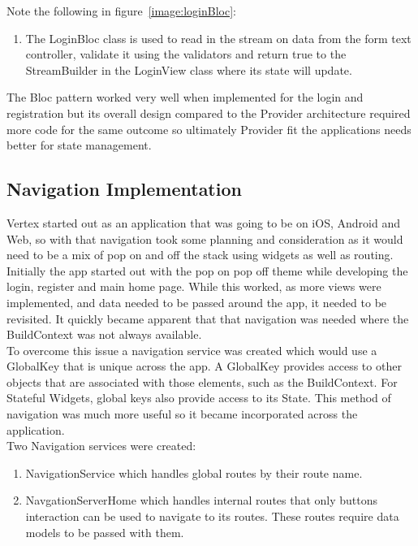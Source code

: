 Note the following in figure~\ref{image:loginBloc}:
\begin{enumerate}
    \item The LoginBloc class is used to read in the stream on data from the form text controller, validate it using the validators and return true to the StreamBuilder in the LoginView class where its state will update.
\end{enumerate}
The Bloc pattern worked very well when implemented for the login and registration but its overall design compared to the Provider architecture required more code for the same outcome so ultimately Provider fit the applications needs better for state management.

\subsection{Navigation Implementation}
\label{NavSection}
Vertex started out as an application that was going to be on iOS, Android and Web, so with that navigation took some planning and consideration as it would need to be a mix of pop on and off the stack using widgets as well as routing.
\\ Initially the app started out with the pop on pop off theme while developing the login, register and main home page. While this worked, as more views were implemented, and data needed to be passed around the app, it needed to be revisited. It quickly became apparent that that navigation was needed where the BuildContext was not always available.
\\ To overcome this issue a navigation service was created which would use a GlobalKey that is unique across the app. A GlobalKey provides access to other objects that are associated with those elements, such as the BuildContext. For Stateful Widgets, global keys also provide access to its State. This method of navigation was much more useful so it became incorporated across the application. 
\\ Two Navigation services were created:
\begin{enumerate}
    \item NavigationService which handles global routes by their route name.
    \item NavgationServerHome which handles internal routes that only buttons interaction can be used to navigate to its routes. These routes require data models to be passed with them.
\end{enumerate}

